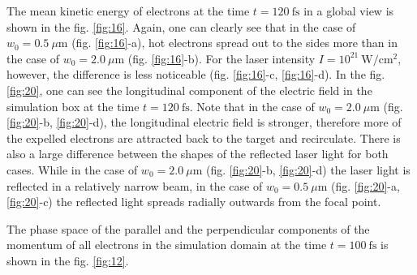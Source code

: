 The mean kinetic energy of electrons at the time $ t = 120 \ \mathrm{fs} $ in a global view is shown in the fig. \ref{fig:16}. Again, one can clearly see that in the case of $ w_0 = 0.5 \ \mu\mathrm{m} $ (fig. \ref{fig:16}-a), hot electrons spread out to the sides more than in the case of $ w_0 = 2.0 \ \mu\mathrm{m} $ (fig. \ref{fig:16}-b). For the laser intensity $ I = 10^{21} \ \mathrm{W/cm^2} $, however, the difference is less noticeable (fig. \ref{fig:16}-c, \ref{fig:16}-d). In the fig. \ref{fig:20}, one can see the longitudinal component of the electric field in the simulation box at the time $ t = 120 \ \mathrm{fs} $. Note that in the case of $ w_0 = 2.0 \ \mu\mathrm{m} $ (fig. \ref{fig:20}-b, \ref{fig:20}-d), the longitudinal electric field is stronger, therefore more of the expelled electrons are attracted back to the target and recirculate. There is also a large difference between the shapes of the reflected laser light for both cases. While in the case of $ w_0 = 2.0 \ \mu\mathrm{m} $ (fig. \ref{fig:20}-b, \ref{fig:20}-d) the laser light is reflected in a relatively narrow beam, in the case of $ w_0 = 0.5 \ \mu\mathrm{m} $ (fig. \ref{fig:20}-a, \ref{fig:20}-c) the reflected light spreads radially outwards from the focal point.

The phase space of the parallel and the perpendicular components of the momentum of all electrons in the simulation domain at the time $ t = 100 \ \mathrm{fs} $ is shown in the fig. \ref{fig:12}. 


